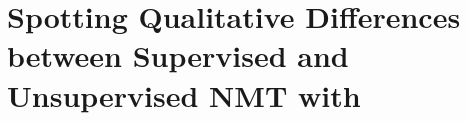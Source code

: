 \section{Spotting Qualitative Differences between Supervised and Unsupervised NMT with }
\label{sec:unmt}

